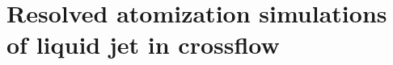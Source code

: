 \chapter{Resolved atomization simulations of liquid jet in crossflow}
\label{ch5:jicf_resolved_simulations}

